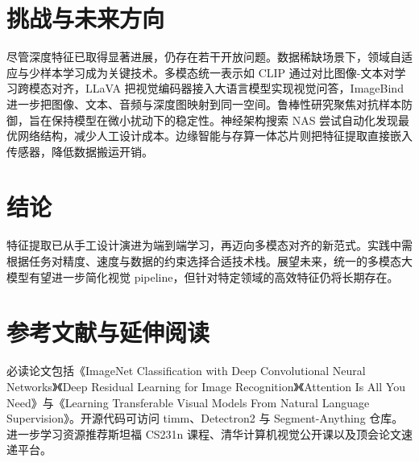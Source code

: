 \chapter{挑战与未来方向}
尽管深度特征已取得显著进展，仍存在若干开放问题。数据稀缺场景下，领域自适应与少样本学习成为关键技术。多模态统一表示如 CLIP 通过对比图像-文本对学习跨模态对齐，LLaVA 把视觉编码器接入大语言模型实现视觉问答，ImageBind 进一步把图像、文本、音频与深度图映射到同一空间。鲁棒性研究聚焦对抗样本防御，旨在保持模型在微小扰动下的稳定性。神经架构搜索 NAS 尝试自动化发现最优网络结构，减少人工设计成本。边缘智能与存算一体芯片则把特征提取直接嵌入传感器，降低数据搬运开销。\par
\chapter{结论}
特征提取已从手工设计演进为端到端学习，再迈向多模态对齐的新范式。实践中需根据任务对精度、速度与数据的约束选择合适技术栈。展望未来，统一的多模态大模型有望进一步简化视觉 pipeline，但针对特定领域的高效特征仍将长期存在。\par
\chapter{参考文献与延伸阅读}
必读论文包括《ImageNet Classification with Deep Convolutional Neural Networks》《Deep Residual Learning for Image Recognition》《Attention Is All You Need》与《Learning Transferable Visual Models From Natural Language Supervision》。开源代码可访问 timm、Detectron2 与 Segment-Anything 仓库。进一步学习资源推荐斯坦福 CS231n 课程、清华计算机视觉公开课以及顶会论文速递平台。\par
